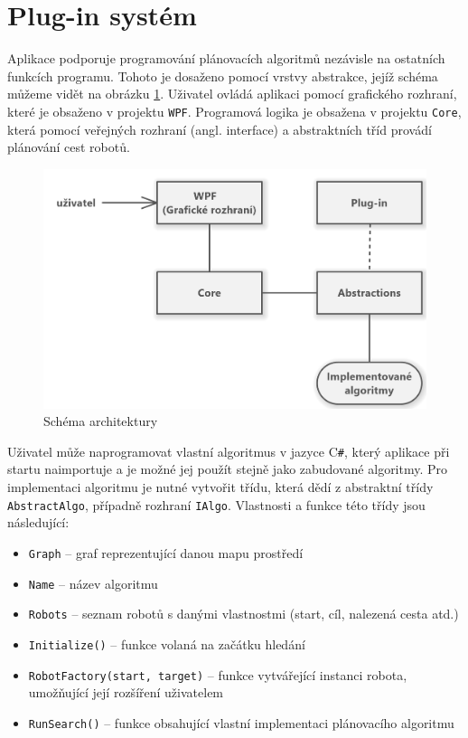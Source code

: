 \section{Plug-in systém}\label{sec:plugins}
Aplikace podporuje programování plánovacích algoritmů nezávisle na ostatních funkcích programu. Tohoto je dosaženo pomocí vrstvy abstrakce, jejíž schéma můžeme vidět na obrázku \ref{obr:pluginsSchema}. Uživatel ovládá aplikaci pomocí grafického rozhraní, které je obsaženo v projektu \texttt{WPF}. Programová logika je obsažena v projektu \texttt{Core}, která pomocí veřejných rozhraní (angl. interface) a abstraktních tříd provádí plánování cest robotů.

\begin{figure}[htb]
	\begin{center}
		\includegraphics*[width=15cm,keepaspectratio]{obr/pluginsSchema2}
	\end{center}
	\caption{Schéma architektury }
	\label{obr:pluginsSchema}
\end{figure}

Uživatel může naprogramovat vlastní algoritmus v jazyce C\texttt{\#}, který aplikace při startu naimportuje a je možné jej použít stejně jako zabudované algoritmy. Pro implementaci algoritmu je nutné vytvořit třídu, která dědí z abstraktní třídy \texttt{AbstractAlgo}, případně rozhraní \texttt{IAlgo}. Vlastnosti a funkce této třídy jsou následující:
\begin{itemize}
	\item \texttt{Graph} -- graf reprezentující danou mapu prostředí
	\item \texttt{Name} -- název algoritmu
	\item \texttt{Robots} -- seznam robotů s danými vlastnostmi (start, cíl, nalezená cesta atd.)
	\item \texttt{Initialize()} -- funkce volaná na začátku hledání
	\item \texttt{RobotFactory(start, target)} -- funkce vytvářející instanci robota, umožňující její rozšíření uživatelem
	\item \texttt{RunSearch()} -- funkce obsahující vlastní implementaci plánovacího algoritmu
\end{itemize}

